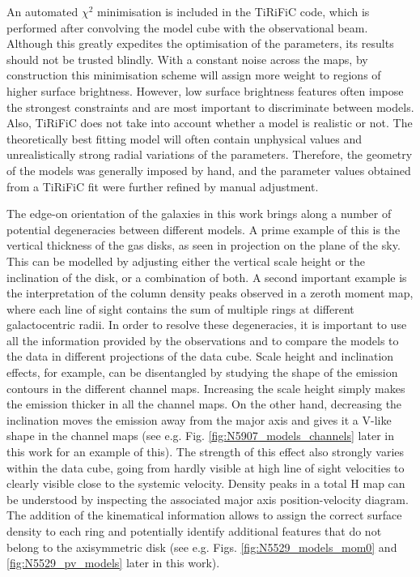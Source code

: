 \documentclass{aa}
\begin{document}
\par
An automated $\chi^2$ minimisation is included in the TiRiFiC code, which is performed after convolving the model cube with the observational beam. Although this greatly expedites the optimisation of the parameters, its results should not be trusted blindly. With a constant noise across the maps, by construction this minimisation scheme will assign more weight to regions of higher surface brightness. However, low surface brightness features often impose the strongest constraints and are most important to discriminate between models. Also, TiRiFiC does not take into account whether a model is realistic or not. The theoretically best fitting model will often contain unphysical values and unrealistically strong radial variations of the parameters. Therefore, the geometry of the models was generally imposed by hand, and the parameter values obtained from a TiRiFiC fit were further refined by manual adjustment.
\par
The edge-on orientation of the galaxies in this work brings along a number of potential degeneracies between different models. A prime example of this is the vertical thickness of the gas disks, as seen in projection on the plane of the sky. This can be modelled by adjusting either the vertical scale height or the inclination of the disk, or a combination of both. A second important example is the interpretation of the column density peaks observed in a zeroth moment map, where each line of sight contains the sum of multiple rings at different galactocentric radii. In order to resolve these degeneracies, it is important to use all the information provided by the observations and to compare the models to the data in different projections of the data cube. Scale height and inclination effects, for example, can be disentangled by studying the shape of the emission contours in the different channel maps. Increasing the scale height simply makes the emission thicker in all the channel maps. On the other hand, decreasing the inclination moves the emission away from the major axis and gives it a V-like shape in the channel maps (see e.g. Fig. \ref{fig:N5907_models_channels} later in this work for an example of this). The strength of this effect also strongly varies within the data cube, going from hardly visible at high line of sight velocities to clearly visible close to the systemic velocity. Density peaks in a total H{} map can be understood by inspecting the associated major axis position-velocity diagram. The addition of the kinematical information allows to assign the correct surface density to each ring and potentially identify additional features that do not belong to the axisymmetric disk (see e.g. Figs. \ref{fig:N5529_models_mom0} and \ref{fig:N5529_pv_models} later in this work).
\end{document}
